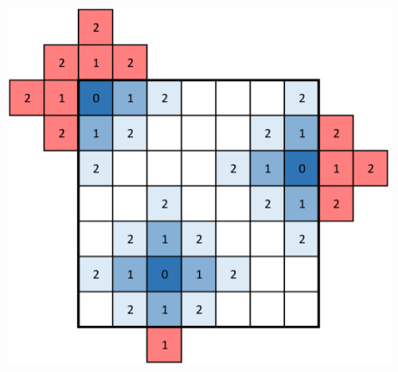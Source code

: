 \begin{frame}
\begin{minipage}{0.47\textwidth}
\begin{figure}
			\end{figure}
		\end{minipage}\hfill
		\begin{minipage}{0.47\textwidth}
			\begin{figure}
				\includegraphics[width=\textwidth]{images/corolle_formes}
			\end{figure}
		
		\end{minipage}\hfill

	\end{frame}
	
